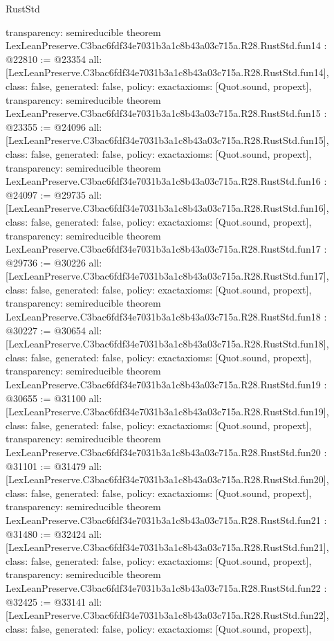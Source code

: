 \begin{lexlean}{RustStd}
\begin{coremodule}
{  transparency: semireducible
}
theorem LexLeanPreserve.C3bac6fdf34e7031b3a1c8b43a03c715a.R28.RustStd.fun14 : @22810 := @23354 {
  all: [LexLeanPreserve.C3bac6fdf34e7031b3a1c8b43a03c715a.R28.RustStd.fun14],
  class: false,
  generated: false,
  policy: exact{axioms: [Quot.sound, propext]},
  transparency: semireducible
}
theorem LexLeanPreserve.C3bac6fdf34e7031b3a1c8b43a03c715a.R28.RustStd.fun15 : @23355 := @24096 {
  all: [LexLeanPreserve.C3bac6fdf34e7031b3a1c8b43a03c715a.R28.RustStd.fun15],
  class: false,
  generated: false,
  policy: exact{axioms: [Quot.sound, propext]},
  transparency: semireducible
}
theorem LexLeanPreserve.C3bac6fdf34e7031b3a1c8b43a03c715a.R28.RustStd.fun16 : @24097 := @29735 {
  all: [LexLeanPreserve.C3bac6fdf34e7031b3a1c8b43a03c715a.R28.RustStd.fun16],
  class: false,
  generated: false,
  policy: exact{axioms: [Quot.sound, propext]},
  transparency: semireducible
}
theorem LexLeanPreserve.C3bac6fdf34e7031b3a1c8b43a03c715a.R28.RustStd.fun17 : @29736 := @30226 {
  all: [LexLeanPreserve.C3bac6fdf34e7031b3a1c8b43a03c715a.R28.RustStd.fun17],
  class: false,
  generated: false,
  policy: exact{axioms: [Quot.sound, propext]},
  transparency: semireducible
}
theorem LexLeanPreserve.C3bac6fdf34e7031b3a1c8b43a03c715a.R28.RustStd.fun18 : @30227 := @30654 {
  all: [LexLeanPreserve.C3bac6fdf34e7031b3a1c8b43a03c715a.R28.RustStd.fun18],
  class: false,
  generated: false,
  policy: exact{axioms: [Quot.sound, propext]},
  transparency: semireducible
}
theorem LexLeanPreserve.C3bac6fdf34e7031b3a1c8b43a03c715a.R28.RustStd.fun19 : @30655 := @31100 {
  all: [LexLeanPreserve.C3bac6fdf34e7031b3a1c8b43a03c715a.R28.RustStd.fun19],
  class: false,
  generated: false,
  policy: exact{axioms: [Quot.sound, propext]},
  transparency: semireducible
}
theorem LexLeanPreserve.C3bac6fdf34e7031b3a1c8b43a03c715a.R28.RustStd.fun20 : @31101 := @31479 {
  all: [LexLeanPreserve.C3bac6fdf34e7031b3a1c8b43a03c715a.R28.RustStd.fun20],
  class: false,
  generated: false,
  policy: exact{axioms: [Quot.sound, propext]},
  transparency: semireducible
}
theorem LexLeanPreserve.C3bac6fdf34e7031b3a1c8b43a03c715a.R28.RustStd.fun21 : @31480 := @32424 {
  all: [LexLeanPreserve.C3bac6fdf34e7031b3a1c8b43a03c715a.R28.RustStd.fun21],
  class: false,
  generated: false,
  policy: exact{axioms: [Quot.sound, propext]},
  transparency: semireducible
}
theorem LexLeanPreserve.C3bac6fdf34e7031b3a1c8b43a03c715a.R28.RustStd.fun22 : @32425 := @33141 {
  all: [LexLeanPreserve.C3bac6fdf34e7031b3a1c8b43a03c715a.R28.RustStd.fun22],
  class: false,
  generated: false,
  policy: exact{axioms: [Quot.sound, propext]},
}
\end{coremodule}
\end{lexlean}
